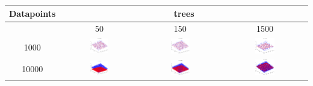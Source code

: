 \begin{tabular}{|c|c|c|c|}
\toprule
Datapoints & \multicolumn{3}{c}{trees} \\ \hline
\midrule
& 50 & 150 & 1500 \\ \hline
1000 & \includegraphics[width=0.25\textwidth]{fig/plane_1k_50} & \includegraphics[width=0.25\textwidth]{fig/plane_1k_150} & \includegraphics[width=0.25\textwidth]{fig/plane_1k_1500} \\ \hline
10000& \includegraphics[width=0.25\textwidth]{fig/plane_10k_50} & \includegraphics[width=0.25\textwidth]{fig/plane_10k_150} & \includegraphics[width=0.25\textwidth]{fig/plane_10k_1500} \\ \hline
\bottomrule
\end{tabular}

